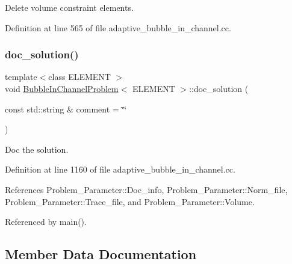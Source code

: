 Delete volume constraint elements. 



Definition at line 565 of file adaptive\+\_\+bubble\+\_\+in\+\_\+channel.\+cc.

\mbox{\label{classBubbleInChannelProblem_a6a68ee06024107d7b3f92059365a06d1}} 
\subsubsection{\texorpdfstring{doc\+\_\+solution()}{doc\_solution()}}
{\footnotesize\ttfamily template$<$class E\+L\+E\+M\+E\+NT $>$ \\
void \hyperlink{classBubbleInChannelProblem}{Bubble\+In\+Channel\+Problem}$<$ E\+L\+E\+M\+E\+NT $>$\+::doc\+\_\+solution (\begin{DoxyParamCaption}\item[{const std\+::string \&}]{comment = {\ttfamily \char`\"{}\char`\"{}} }\end{DoxyParamCaption})}



Doc the solution. 



Definition at line 1160 of file adaptive\+\_\+bubble\+\_\+in\+\_\+channel.\+cc.



References Problem\+\_\+\+Parameter\+::\+Doc\+\_\+info, Problem\+\_\+\+Parameter\+::\+Norm\+\_\+file, Problem\+\_\+\+Parameter\+::\+Trace\+\_\+file, and Problem\+\_\+\+Parameter\+::\+Volume.



Referenced by main().



\subsection{Member Data Documentation}
\mbox{\label{classBubbleInChannelProblem_a31c26dd6bdb8071bf80bb7c4b29930d7}} 
